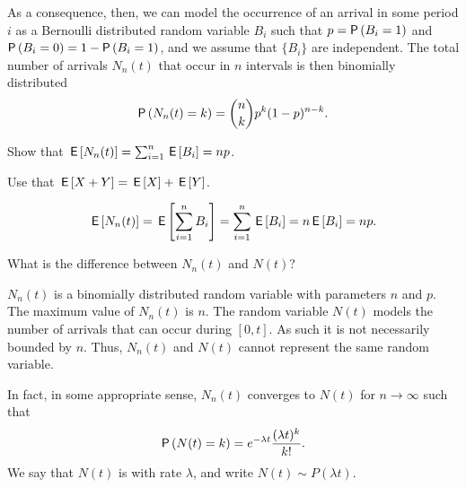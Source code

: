 As a consequence, then, we can model the occurrence of an arrival in
some period $i$ as a Bernoulli distributed random variable $B_i$ such
that $p=\P{B_i =1}$ and $\P{B_i=0} = 1-\P{B_i = 1}$, and we assume that
$\{B_i\}$ are independent. The total number of arrivals $N_n(t)$ that
occur in $n$ intervals is then binomially distributed
\begin{equation}\label{eq:bin}
  \P{N_n(t) = k} = {n \choose k} p^k (1-p)^{n-k}.
\end{equation}

\begin{exercise}
Show that $\,\mathsf{E}\left[N_n(t)\right] = \sum_{i=1}^n \,\mathsf{E}\left[B_i\right] = n p$.
\begin{hint}
Use that $\,\mathsf{E}\left[X+Y\right] = \,\mathsf{E}\left[X\right] + \,\mathsf{E}\left[Y\right]$. 
\end{hint}
\begin{solution}
  \begin{equation*}
    \,\mathsf{E}\left[N_n(t)\right] = \,\mathsf{E}\left[\sum_{i=1}^n {B_i}\right] = \sum_{i=1}^n \,\mathsf{E}\left[B_i\right] = n \,\mathsf{E}\left[B_i\right] = n p.
  \end{equation*}
\end{solution}
\end{exercise}

\begin{exercise}
What is the difference between $N_n(t)$ and $N(t)$?
\begin{solution}
  $N_n(t)$ is a binomially distributed random variable with parameters
  $n$ and $p$. The maximum value of $N_n(t)$ is $n$. The random
  variable $N(t)$ models the number of arrivals that can occur during
  $[0,t]$. As such it is not necessarily bounded by $n$. Thus, $N_n(t)$ and $N(t)$ cannot represent the same random variable. 
\end{solution}
\end{exercise}


In fact, in some appropriate sense, $N_n(t)$ converges to $N(t)$ for $n\to \infty$ such
that
\begin{equation}\label{eq:pois}
  \P{N(t) = k} = 
e^{-\lambda t} \frac{(\lambda t)^k}{k!}.
\end{equation}
We say that $N(t)$ is  with rate
$\lambda$, and write $N(t)\sim P(\lambda t)$. 


